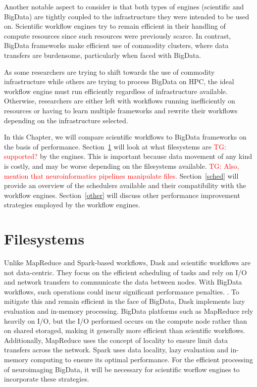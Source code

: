 \documentclass{report}
\newcommand{\tristan}[1]{\textcolor{red}{TG: #1}}
\newcommand{\weird}[1]{\uwave{#1}}
\begin{document}
        Another notable aspect to consider is that both types of engines 
        (scientific and BigData) are tightly coupled to the infrastructure
        they were intended to be used on. Scientific workflow engines
        try to remain efficient in their handling of compute resources since such
        resources were previously scarce. In contrast, BigData frameworks 
        make efficient use of commodity clusters, where data transfers are 
        burdensome, particularly when faced with BigData.

        As some researchers are trying to shift towards the use of commodity 
        infrastructure while others are trying to process BigData on HPC, the 
        ideal workflow engine must run efficiently regardless of 
        infrastructure available. Otherwise, researchers are either left with
        workflows running inefficiently on resources or having to learn 
        multiple frameworks and rewrite their workflows depending on the 
        infrastructure selected.
 
        In this Chapter, we will compare scientific
        workflows to BigData frameworks on the basis of performance. 
        Section~\ref{fs} will look at what filesystems are \weird{required} \tristan{supported?} by the 
        engines. This is important because data movement of any kind is costly,
        and may be worse depending on the filesystems available. \tristan{Also, mention that neuroinformatics
        pipelines manipulate files.}
        Section~\ref{sched} will provide an overview of the schedulers 
        available and their compatibility with the workflow engines. 
        Section~\ref{other} will discuss other performance improvement 
        strategies employed by the workflow engines.
 
        \section{Filesystems}\label{fs}
            
            
            Unlike MapReduce and Spark-based workflows, Dask and scientific 
            workflows are not data-centric. They focus on the efficient 
            scheduling of tasks and rely on I/O and network transfers to
            communicate the data between nodes. With BigData workflows, such
            operations could incur significant performance penalties. 
            \weird{Filesystems}. To mitigate this and remain efficient in the face of
            BigData, Dask implements lazy evaluation and in-memory processing.
            BigData platforms such as MapReduce rely heavily on I/O, but the 
            I/O performed occurs on the compute node rather than on 
            shared storaged, making it generally more efficient than scientific
            workflows. Additionally, MapReduce uses the concept of 
            locality to ensure limit data transfers across the network. Spark
            uses data locality, lazy evaluation and in-memory computing to 
            ensure its optimal performance.
            For the efficient processing of neuroimaging BigData, it will be
            necessary for scientific worflow engines to incorporate these 
            strategies.
        
\end{document}
